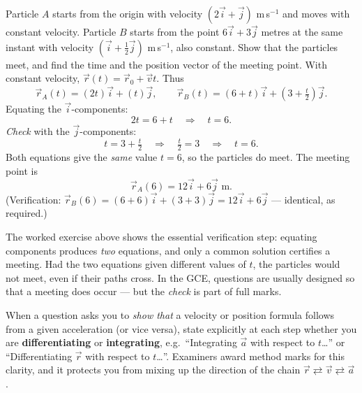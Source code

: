 \documentclass[11pt]{article}
\begin{document}
\begin{exoresolu}
Particle $A$ starts from the origin with velocity $(2\vec{i} + \vec{j})$ m\,s$^{-1}$ and moves with constant velocity. Particle $B$ starts from the point $6\vec{i} + 3\vec{j}$ metres at the same instant with velocity $(\vec{i} + \tfrac{1}{2}\vec{j})$ m\,s$^{-1}$, also constant. Show that the particles meet, and find the time and the position vector of the meeting point.
\tcblower
With constant velocity, $\vec{r}(t) = \vec{r}_0 + \vec{v}t$. Thus
\[
\vec{r}_A(t) = (2t)\vec{i} + (t)\vec{j}, \qquad \vec{r}_B(t) = (6 + t)\vec{i} + \left(3 + \tfrac{t}{2}\right)\vec{j}.
\]
Equating the $\vec{i}$-components:
\[
2t = 6 + t \quad\Longrightarrow\quad t = 6.
\]
\emph{Check} with the $\vec{j}$-components:
\[
t = 3 + \tfrac{t}{2} \quad\Longrightarrow\quad \tfrac{t}{2} = 3 \quad\Longrightarrow\quad t = 6.
\]
Both equations give the \emph{same} value $t = 6$, so the particles do meet. The meeting point is
\[
\vec{r}_A(6) = 12\vec{i} + 6\vec{j} \text{ m}.
\]
(Verification: $\vec{r}_B(6) = (6+6)\vec{i} + (3+3)\vec{j} = 12\vec{i} + 6\vec{j}$ --- identical, as required.)
\end{exoresolu}

The worked exercise above shows the essential verification step: equating components produces \emph{two} equations, and only a common solution certifies a meeting. Had the two equations given different values of $t$, the particles would not meet, even if their paths cross. In the GCE, questions are usually designed so that a meeting does occur --- but the \emph{check} is part of full marks.

\begin{attention}
When a question asks you to \emph{show that} a velocity or position formula follows from a given acceleration (or vice versa), state explicitly at each step whether you are \textbf{differentiating} or \textbf{integrating}, e.g.\ ``Integrating $\vec{a}$ with respect to $t$\ldots'' or ``Differentiating $\vec{r}$ with respect to $t$\ldots''. Examiners award method marks for this clarity, and it protects you from mixing up the direction of the chain $\vec{r} \rightleftarrows \vec{v} \rightleftarrows \vec{a}$.
\end{attention}
\end{document}
